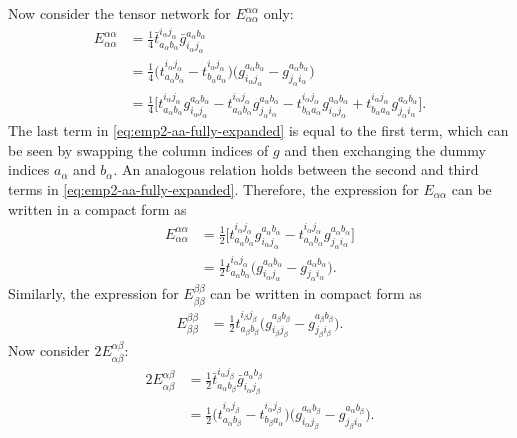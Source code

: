 \documentclass[11pt,oneside]{book}
\begin{document}
Now consider the tensor network for $E_{\alpha \alpha}^{\alpha \alpha}$ only:
\begin{align}
    E_{\alpha \alpha}^{\alpha \alpha}
    &= \frac{1}{4} \bar{t}_{a_\alpha b_\alpha}^{i_\alpha j_\alpha} \bar{g}_{i_\alpha j_\alpha}^{a_\alpha b_\alpha}\\
    &= \frac{1}{4} 
       \bigl(  t_{a_\alpha b_\alpha}^{i_\alpha j_\alpha} - t_{b_\alpha a_\alpha}^{i_\alpha j_\alpha} \bigr)
       \bigl( g_{i_\alpha j_\alpha}^{a_\alpha b_\alpha} - g_{j_\alpha i_\alpha}^{a_\alpha b_\alpha} \bigr) \\
    &= \frac{1}{4} \bigl[ 
        t_{a_\alpha b_\alpha}^{i_\alpha j_\alpha} g_{i_\alpha j_\alpha}^{a_\alpha b_\alpha}
      - t_{a_\alpha b_\alpha}^{i_\alpha j_\alpha} g_{j_\alpha i_\alpha}^{a_\alpha b_\alpha}  
      - t_{b_\alpha a_\alpha}^{i_\alpha j_\alpha} g_{i_\alpha j_\alpha}^{a_\alpha b_\alpha}
      + t_{b_\alpha a_\alpha}^{i_\alpha j_\alpha} g_{j_\alpha i_\alpha}^{a_\alpha b_\alpha} 
      \bigr] .
      \label{eq:emp2-aa-fully-expanded}
\end{align}
The last term in \cref{eq:emp2-aa-fully-expanded} is equal to the first term, which can be seen by swapping the column indices of $g$ and then exchanging the dummy indices $a_\alpha$ and $b_\alpha$. An analogous relation holds between the second and third terms in \cref{eq:emp2-aa-fully-expanded}. Therefore, the expression for $E_{\alpha \alpha}$ can be written in a compact form as
\begin{align}
    E_{\alpha \alpha}^{\alpha \alpha}
    &= \frac{1}{2} \bigl[ 
        t_{a_\alpha b_\alpha}^{i_\alpha j_\alpha} g_{i_\alpha j_\alpha}^{a_\alpha b_\alpha}
      - t_{a_\alpha b_\alpha}^{i_\alpha j_\alpha} g_{j_\alpha i_\alpha}^{a_\alpha b_\alpha}  
    \bigr] \\
    &= \frac{1}{2} t_{a_\alpha b_\alpha}^{i_\alpha j_\alpha}
       \bigl( g_{i_\alpha j_\alpha}^{a_\alpha b_\alpha} - g_{j_\alpha i_\alpha}^{a_\alpha b_\alpha} \bigr)\label{eq:emp2-aaaa}.
\end{align}
Similarly, the expression for $E_{\beta \beta}^{\beta \beta}$ can be written in compact form as
\begin{align}\label{eq:emp2-bbbb}
    E_{\beta \beta}^{\beta \beta}
    &= \frac{1}{2} t_{a_\beta b_\beta}^{i_\beta j_\beta} 
       \bigl( g_{i_\beta j_\beta}^{a_\beta b_\beta} - g_{j_\beta i_\beta}^{a_\beta b_\beta} \bigr) .
\end{align}
Now consider $2E_{\alpha \beta}^{\alpha \beta}$:
\begin{align}
    2E_{\alpha \beta}^{\alpha \beta} 
    &= \frac{1}{2} \bar{t}_{a_\alpha b_\beta}^{i_\alpha j_\beta} \bar{g}_{i_\alpha j_\beta}^{a_\alpha b_\beta} \\
    &= \frac{1}{2}
       \bigl(t_{a_\alpha b_\beta}^{i_\alpha j_\beta} - t_{b_\beta a_\alpha}^{i_\alpha j_\beta}\bigr)
       \bigl(g_{i_\alpha j_\beta}^{a_\alpha b_\beta} - g_{j_\beta i_\alpha}^{a_\alpha b_\beta}\bigr).
       \label{eq:emp2-ab-fully-expanded}
\end{align}
\end{document}
